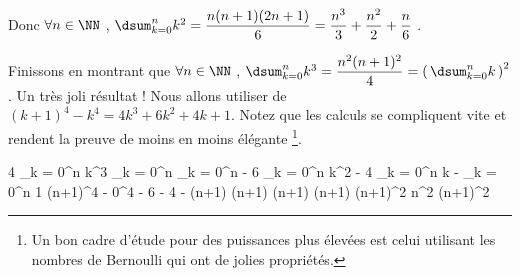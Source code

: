 \medskip

Donc
$\forall n \in \NN$ , $\dsum_{k = 0}^{n} k^2 = \dfrac{n(n + 1)(2n + 1)}{6} = \dfrac{n^3}{3} + \dfrac{n^2}{2} + \dfrac{n}{6}$ .


\medskip

Finissons en montrant que
$\forall n \in \NN$ , $\dsum_{k = 0}^{n} k^3 = \dfrac{n^2 (n + 1)^2}{4} = \left( \, \dsum_{k = 0}^{n} k \, \right)^2$ . Un très joli résultat !
Nous allons utiliser de $(k+1)^4 - k^4 = 4 k^3 + 6 k^2 + 4 k + 1$.
Notez que les calculs se compliquent vite et rendent la preuve de moins en moins élégante
\footnote{
	Un bon cadre d'étude pour des puissances plus élevées est celui utilisant les nombres de Bernoulli qui ont de jolies propriétés.
}.

\medskip

\begin{stepcalc}[style = sar]
	4 \dsum_{k = 0}^{n} k^3
		\explnext{}
	\dsum_{k = 0}^{n} \big[ \, (k+1)^4 - k^4 - 6 k^2 - 4 k - 1 \, \big]
		\explnext{}
	\dsum_{k = 0}^{n} \big[ \, (k+1)^4 - k^4 \, \big] - 6 \dsum_{k = 0}^{n} k^2 - 4 \dsum_{k = 0}^{n} k - \dsum_{k = 0}^{n} 1
		\explnext{}
	(n+1)^4 - 0^4 - 6 \cdot {} - 4 \cdot {} - (n+1)
		\explnext{}
	(n+1) \cdot \big[ \, (n+1)^3 - n(2n + 1) - 2n - 1 \, \big]
		\explnext{}
	(n+1) \cdot \big[ \, (n+1)^3 - 2n^2 - 3n - 1 \, \big]
	(n+1) \cdot \big[ \, (n+1)^3 - (n+1)(2n + 1) \, \big]
		\explnext{}
	(n+1)^2 \cdot \big[ \, (n+1)^2 - 2n - 1 \, \big]
		\explnext{}
	n^2 (n+1)^2
\end{stepcalc}



